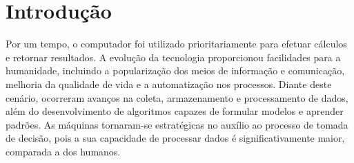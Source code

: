 

\chapter{Introdução}
    \label{cha:intro}
    Por um tempo, o computador foi utilizado prioritariamente para efetuar cálculos e retornar resultados. A evolução da tecnologia proporcionou facilidades para a humanidade, incluindo a popularização dos meios de informação e comunicação, melhoria da qualidade de vida e a automatização nos processos. Diante deste cenário, ocorreram avanços na coleta, armazenamento e processamento de dados, além do desenvolvimento de algoritmos capazes de formular modelos e aprender padrões. As máquinas tornaram\hyp{se} estratégicas no auxílio ao processo de tomada de decisão, pois a sua capacidade de processar dados é significativamente maior, comparada a dos humanos.
    
    
    
    
    
    

